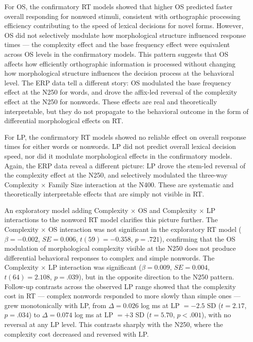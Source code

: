 \documentclass[utf8]{FrontiersinHarvard} %
\begin{document}
	For OS, the confirmatory RT models showed that higher OS predicted faster overall responding for nonword stimuli, consistent with orthographic processing efficiency contributing to the speed of lexical decisions for novel forms. However, OS did not selectively modulate how morphological structure influenced response times --- the complexity effect and the base frequency effect were equivalent across OS levels in the confirmatory models. This pattern suggests that OS affects how efficiently orthographic information is processed without changing how morphological structure influences the decision process at the behavioral level. The ERP data tell a different story: OS modulated the base frequency effect at the N250 for words, and drove the affix-led reversal of the complexity effect at the N250 for nonwords. These effects are real and theoretically interpretable, but they do not propagate to the behavioral outcome in the form of differential morphological effects on RT.
	
	For LP, the confirmatory RT models showed no reliable effect on overall response times for either words or nonwords. LP did not predict overall lexical decision speed, nor did it modulate morphological effects in the confirmatory models. Again, the ERP data reveal a different picture: LP drove the stem-led reversal of the complexity effect at the N250, and selectively modulated the three-way Complexity $\times$ Family Size interaction at the N400. These are systematic and theoretically interpretable effects that are simply not visible in RT.
	
	An exploratory model adding Complexity $\times$ OS and Complexity $\times$ LP interactions to the nonword RT model clarifies this picture further. The Complexity $\times$ OS interaction was not significant in the exploratory RT model ($\beta = -0.002$, $SE = 0.006$, $t(59) = -0.358$, $p = .721$), confirming that the OS modulation of morphological complexity visible at the N250 does not produce differential behavioral responses to complex and simple nonwords. The Complexity $\times$ LP interaction was significant ($\beta = 0.009$, $SE = 0.004$, $t(64) = 2.108$, $p = .039$), but in the opposite direction to the N250 pattern. Follow-up contrasts across the observed LP range showed that the complexity cost in RT --- complex nonwords responded to more slowly than simple ones --- grew monotonically with LP, from $\Delta = 0.026$ log ms at LP $= -2.5$ SD ($t = 2.17$, $p = .034$) to $\Delta = 0.074$ log ms at LP $= +3$ SD ($t = 5.70$, $p < .001$), with no reversal at any LP level. This contrasts sharply with the N250, where the complexity cost decreased and reversed with LP.
	
\end{document}
